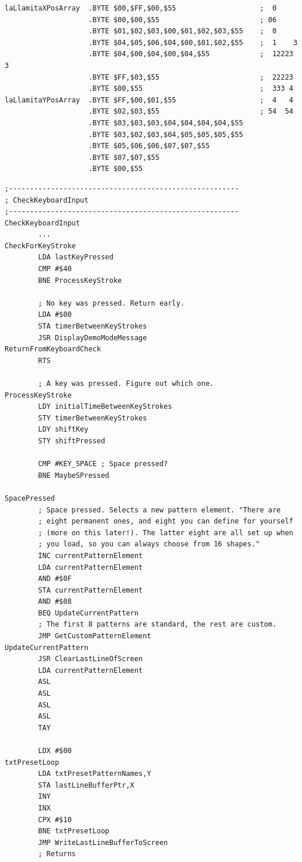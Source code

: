 \begin{lstlisting}
laLlamitaXPosArray  .BYTE $00,$FF,$00,$55                    ;  0       
                    .BYTE $00,$00,$55                        ; 06      
                    .BYTE $01,$02,$03,$00,$01,$02,$03,$55    ;  0      
                    .BYTE $04,$05,$06,$04,$00,$01,$02,$55    ;  1    3 
                    .BYTE $04,$00,$04,$00,$04,$55            ;  12223 3
                    .BYTE $FF,$03,$55                        ;  22223  
                    .BYTE $00,$55                            ;  333 4  
laLlamitaYPosArray  .BYTE $FF,$00,$01,$55                    ;  4   4  
                    .BYTE $02,$03,$55                        ; 54  54  
                    .BYTE $03,$03,$03,$04,$04,$04,$04,$55
                    .BYTE $03,$02,$03,$04,$05,$05,$05,$55
                    .BYTE $05,$06,$06,$07,$07,$55
                    .BYTE $07,$07,$55
                    .BYTE $00,$55

\end{lstlisting}


\clearpage
\begin{lstlisting}[basicstyle=\ttfamily\scriptsize]
;-------------------------------------------------------
; CheckKeyboardInput
;-------------------------------------------------------
CheckKeyboardInput   
        ...
CheckForKeyStroke   
        LDA lastKeyPressed
        CMP #$40
        BNE ProcessKeyStroke

        ; No key was pressed. Return early.
        LDA #$00
        STA timerBetweenKeyStrokes
        JSR DisplayDemoModeMessage
ReturnFromKeyboardCheck   
        RTS 

        ; A key was pressed. Figure out which one.
ProcessKeyStroke   
        LDY initialTimeBetweenKeyStrokes
        STY timerBetweenKeyStrokes
        LDY shiftKey
        STY shiftPressed

        CMP #KEY_SPACE ; Space pressed?
        BNE MaybeSPressed

SpacePressed
        ; Space pressed. Selects a new pattern element. "There are
        ; eight permanent ones, and eight you can define for yourself
        ; (more on this later!). The latter eight are all set up when
        ; you load, so you can always choose from 16 shapes."
        INC currentPatternElement
        LDA currentPatternElement
        AND #$0F
        STA currentPatternElement
        AND #$08
        BEQ UpdateCurrentPattern
        ; The first 8 patterns are standard, the rest are custom.
        JMP GetCustomPatternElement
UpdateCurrentPattern   
        JSR ClearLastLineOfScreen
        LDA currentPatternElement
        ASL 
        ASL 
        ASL 
        ASL 
        TAY 

        LDX #$00
txtPresetLoop   
        LDA txtPresetPatternNames,Y
        STA lastLineBufferPtr,X
        INY 
        INX 
        CPX #$10
        BNE txtPresetLoop
        JMP WriteLastLineBufferToScreen
        ; Returns
\end{lstlisting}
\clearpage

